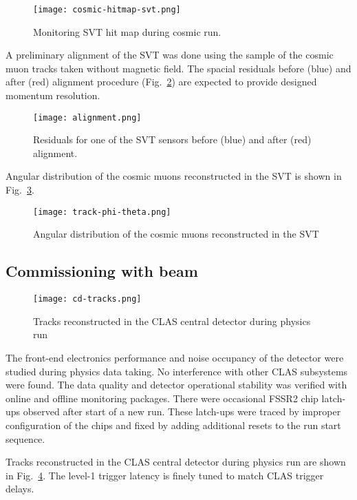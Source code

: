 \begin{figure}[hbt] 
\centering 
\texttt{[image: cosmic-hitmap-svt.png]}
\caption{Monitoring SVT hit map during cosmic run.}
\label{fig:cosmic-hitmap-svt}
\end{figure}

A preliminary alignment of the SVT was done using the sample of the cosmic muon tracks taken without magnetic field. The spacial residuals before (blue) and after (red) alignment procedure (Fig.~\ref{fig:alignment}) are expected to provide designed momentum resolution.

\begin{figure}[hbt] 
\centering 
\texttt{[image: alignment.png]}
\caption{Residuals for one of the SVT sensors before (blue) and after (red) alignment.}
\label{fig:alignment}
\end{figure}

Angular distribution of the cosmic muons reconstructed in the SVT is shown in Fig.~\ref{fig:track-phi-theta}.

\begin{figure}[hbt] 
\centering 
\texttt{[image: track-phi-theta.png]}
\caption{Angular distribution of the cosmic muons reconstructed in the SVT}
\label{fig:track-phi-theta}
\end{figure}

\subsection{Commissioning with beam}

\begin{figure}[hbt] 
\centering 
\texttt{[image: cd-tracks.png]}
\caption{Tracks reconstructed in the CLAS central detector during physics run}
\label{fig:cd-tracks}
\end{figure}

The front-end electronics performance and noise occupancy of the detector were studied during physics data taking. No interference with other CLAS subsystems were found. The data quality and detector operational stability  was verified with online and offline monitoring packages. There were occasional FSSR2 chip latch-ups observed after start of a new run. These latch-ups were traced by improper configuration of the chips and fixed by adding additional resets to the run start sequence.

Tracks reconstructed in the CLAS central detector during physics run are shown in Fig.~\ref{fig:cd-tracks}. The level-1 trigger latency is finely tuned to match CLAS trigger delays.

